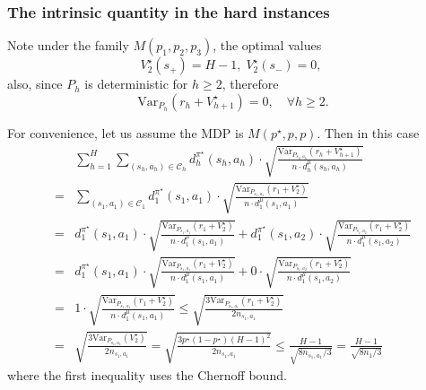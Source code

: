 \subsubsection{The intrinsic quantity in the hard instances}\label{subsec:lower}

Note under the family $M(p_1,p_2,p_3)$, the optimal values
\[
V^\star_2(s_+)=H-1,\;V^\star_2(s_-)=0,\;
\]
also, since $P_h$ is deterministic for $h\geq 2$, therefore 
\[
\mathrm{Var}_{P_h}(r_h+V^\star_{h+1})=0,\quad \forall h\geq 2.
\] 

For convenience, let us assume the MDP is $M(p^\star,p,p)$. Then in this case
\begin{equation}\label{eqn:lower_inter_2}
\begin{aligned}
&\sum_{h=1}^H\sum_{(s_h,a_h)\in\mathcal{C}_h}d^{\pi^\star}_h(s_h,a_h)\cdot\sqrt{\frac{\mathrm{Var}_{P_{s_h,a_h}}(r_h+V^\star_{h+1})}{ n\cdot d^\mu_h{(s_h,a_h)}}}\\
= &\sum_{(s_1,a_1)\in\mathcal{C}_1}d^{\pi^\star}_1(s_1,a_1)\cdot\sqrt{\frac{\mathrm{Var}_{P_{s_1,a_1}}(r_1+V^\star_{2})}{ n\cdot d^\mu_1{(s_1,a_1)}}}\\
=&d^{\pi^\star}_1(s_1,a_1)\cdot\sqrt{\frac{\mathrm{Var}_{P_{s_1,a_1}}(r_1+V^\star_{2})}{ n\cdot d^\mu_1{(s_1,a_1)}}}+d^{\pi^\star}_1(s_1,a_2)\cdot\sqrt{\frac{\mathrm{Var}_{P_{s_1,a_2}}(r_1+V^\star_{2})}{ n\cdot d^\mu_1{(s_1,a_2)}}}\\
=&d^{\pi^\star}_1(s_1,a_1)\cdot\sqrt{\frac{\mathrm{Var}_{P_{s_1,a_1}}(r_1+V^\star_{2})}{ n\cdot d^\mu_1{(s_1,a_1)}}}+0\cdot\sqrt{\frac{\mathrm{Var}_{P_{s_1,a_2}}(r_1+V^\star_{2})}{ n\cdot d^\mu_1{(s_1,a_2)}}}\\
=&1\cdot\sqrt{\frac{\mathrm{Var}_{P_{s_1,a_1}}(r_1+V^\star_{2})}{ n\cdot d^\mu_1{(s_1,a_1)}}}\leq \sqrt{\frac{3\mathrm{Var}_{P_{s_1,a_1}}(r_1+V^\star_{2})}{2 n_{s_1,a_1}}}\\
=&\sqrt{\frac{3\mathrm{Var}_{P_{s_1,a_1}}(V^\star_{2})}{ 2n_{s_1,a_1}}}=\sqrt{\frac{3p^\star(1-p^\star)(H-1)^2}{2 n_{s_1,a_1}}}\leq \frac{H-1}{\sqrt{8n_{s_1,a_1}/3}}=\frac{H-1}{\sqrt{8n_{1}/3}}
\end{aligned}
\end{equation}
where the first inequality uses the Chernoff bound. 


